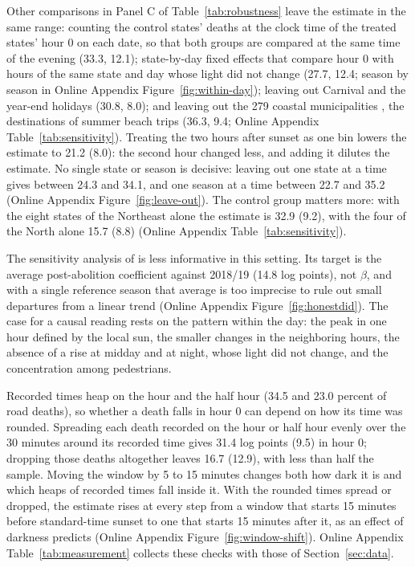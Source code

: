 Other comparisons in Panel C of Table~\ref{tab:robustness} leave the estimate in the same range: counting the control states' deaths at the clock time of the treated states' hour 0 on each date, so that both groups are compared at the same time of the evening (33.3, 12.1); state-by-day fixed effects that compare hour 0 with hours of the same state and day whose light did not change (27.7, 12.4; season by season in Online Appendix Figure~\ref{fig:within-day}); leaving out Carnival and the year-end holidays (30.8, 8.0); and leaving out the 279 coastal municipalities \citep{ibge2022defrontantes}, the destinations of summer beach trips (36.3, 9.4; Online Appendix Table~\ref{tab:sensitivity}). Treating the two hours after sunset as one bin lowers the estimate to 21.2 (8.0): the second hour changed less, and adding it dilutes the estimate. No single state or season is decisive: leaving out one state at a time gives between 24.3 and 34.1, and one season at a time between 22.7 and 35.2 (Online Appendix Figure~\ref{fig:leave-out}). The control group matters more: with the eight states of the Northeast alone the estimate is 32.9 (9.2), with the four of the North alone 15.7 (8.8) (Online Appendix Table~\ref{tab:sensitivity}).

The sensitivity analysis of \citet{rambachan2023more} is less informative in this setting. Its target is the average post-abolition coefficient against 2018/19 (14.8 log points), not $\beta$, and with a single reference season that average is too imprecise to rule out small departures from a linear trend (Online Appendix Figure~\ref{fig:honestdid}). %
The case for a causal reading rests on the pattern within the day: the peak in one hour defined by the local sun, the smaller changes in the neighboring hours, the absence of a rise at midday and at night, whose light did not change, and the concentration among pedestrians.

Recorded times heap on the hour and the half hour (34.5 and 23.0 percent of road deaths), so whether a death falls in hour 0 can depend on how its time was rounded. Spreading each death recorded on the hour or half hour evenly over the 30 minutes around its recorded time gives 31.4 log points (9.5) in hour 0; dropping those deaths altogether leaves 16.7 (12.9), with less than half the sample. Moving the window by 5 to 15 minutes changes both how dark it is and which heaps of recorded times fall inside it. With the rounded times spread or dropped, the estimate rises at every step from a window that starts 15 minutes before standard-time sunset to one that starts 15 minutes after it, as an effect of darkness predicts (Online Appendix Figure~\ref{fig:window-shift}). Online Appendix Table~\ref{tab:measurement} collects these checks with those of Section~\ref{sec:data}.

